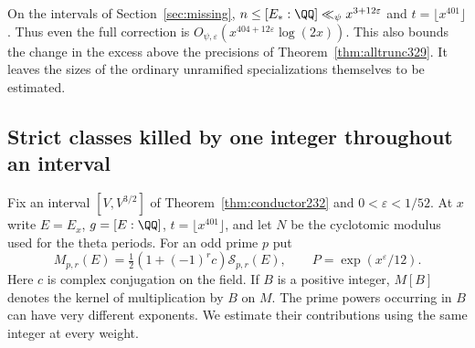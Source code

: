 \documentclass[a4paper,11pt]{article}
\theoremstyle{definition}
\theoremstyle{remark}
\numberwithin{equation}{section}
\begin{document}
On the intervals of Section~\ref{sec:missing}, \(n\le
[E_*:\QQ]\ll_\psi x^{3+12\varepsilon}\) and
\(t=\lfloor x^{401}\rfloor\). Thus even the full correction
is \(O_{\psi,\varepsilon}(x^{404+12\varepsilon}\log(2x))\).
This also bounds the change in the excess above the precisions
of Theorem~\ref{thm:alltrunc329}. It leaves the sizes of the
ordinary unramified specializations themselves to be estimated.


\subsection{Strict classes killed by one integer throughout an interval}\label{sec:integerlayers333}

Fix an interval \([V,V^{3/2}]\) of Theorem~\ref{thm:conductor232}
and \(0<\varepsilon<1/52\). At \(x\) write \(E=E_x\), \(g=[E:\QQ]\),
\(t=\lfloor x^{401}\rfloor\), and let \(N\) be the cyclotomic modulus
used for the theta periods. For an odd prime \(p\) put
\[
  M_{p,r}(E)=\tfrac12(1+(-1)^rc)\mathcal S_{p,r}(E),
  \qquad P=\exp(x^\varepsilon/12).
\]
Here \(c\) is complex conjugation on the field. If \(B\) is a positive
integer, \(M[B]\) denotes the kernel of multiplication by \(B\) on \(M\).
The prime powers occurring in \(B\) can have very different exponents.
We estimate their contributions using the same integer at every weight.
\end{document}
